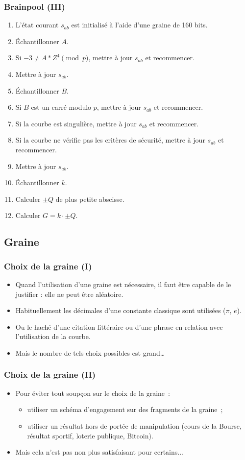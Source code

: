 \documentclass[francais]{beamer}
\begin{document}
\begin{frame}\frametitle{Brainpool (III)}
\begin{enumerate}
\item L'état courant $s_{ab}$ est initialisé à l'aide d'une  graine de 160 bits.
\item Échantillonner $A$.
\item Si $-3 \neq A*Z^4 \pmod{p}$, mettre à jour $s_{ab}$ et recommencer.
\item Mettre à jour $s_{ab}$.
\item Échantillonner $B$.
\item Si $B$ est un carré modulo $p$, mettre à jour $s_{ab}$ et recommencer.
\item Si la courbe est singulière, mettre à jour $s_{ab}$ et recommencer.
\item Si la courbe ne vérifie pas les critères de sécurité, mettre à jour $s_{ab}$ et recommencer.
\item Mettre à jour $s_{ab}$.
\item Échantillonner $k$.
\item Calculer $\pm Q$ de plus petite abscisse.
\item Calculer $G = k \cdot \pm Q$.
\end{enumerate}
\end{frame}


\subsection{Graine}

\begin{frame}\frametitle{Choix de la graine (I)}
\begin{itemize}
\item Quand l'utilisation d'une graine est nécessaire, il faut être capable de le justifier : elle ne peut être aléatoire.
\item Habituellement les décimales d'une constante classique sont utilisées ($\pi$, $e$).
\item Ou le haché d'une citation littéraire ou d'une phrase en relation avec l'utilisation de la courbe.
\item Mais le nombre de tels choix possibles est grand\ldots
\end{itemize}
\end{frame}

\begin{frame}\frametitle{Choix de la graine (II)}
\begin{itemize}
\item Pour éviter tout soupçon sur le choix de la graine :
\begin{itemize}
\item utiliser un schéma d'engagement sur des fragments de la graine ;
\item utiliser un résultat hors de portée de manipulation
(cours de la Bourse, résultat sportif, loterie publique, Bitcoin).
\end{itemize}
\item Mais cela n'est pas non plus satisfaisant pour certains...
\end{itemize}
\end{frame}
\end{document}
